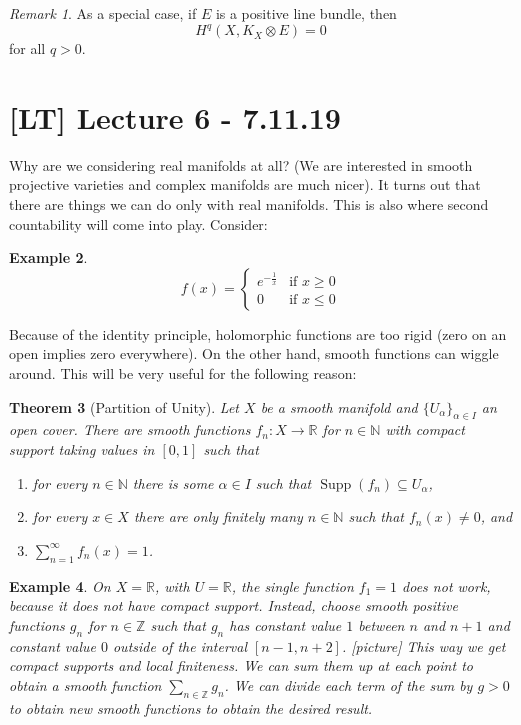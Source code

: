 \documentclass[12pt]{article}
\theoremstyle{darkgreentheorem}
\newtheorem{thm}{Theorem}[section]
\theoremstyle{darkbluedefinition}
\theoremstyle{darkredexample}
\newtheorem{exa}[thm]{Example}
\theoremstyle{remark}
\newtheorem{rem}[thm]{Remark}
\newcommand{\N}{\mathbb{N}}
\newcommand{\Z}{\mathbb{Z}}
\newcommand{\R}{\mathbb{R}}
\newcommand{\1}{\mathbbm{1}}
\DeclareMathOperator{\Supp}{Supp}
\newcommand{\ot}{\otimes}
\begin{document}
\begin{rem}
    As a special case, if $E$ is a positive line bundle, then
    \[H^{q}(X,K_{X}\ot E)=0\]
    for all $q>0$.
\end{rem}

\section{[LT] Lecture 6 - 7.11.19}

Why are we considering real manifolds at all?
(We are interested in smooth projective varieties and complex manifolds are much nicer).
It turns out that there are things we can do only with real manifolds.
This is also where second countability will come into play.
Consider:

\begin{exa}
    \[ f(x)=\begin{cases} e^{-\frac{1}{x}} &\text{if } x\geqslant 0 \\ 0 &\text{if } x\leqslant 0
    \end{cases} \]
\end{exa}
Because of the identity principle, holomorphic functions are too rigid (zero on an open implies zero everywhere).
On the other hand, smooth functions can wiggle around.
This will be very useful for the following reason:

\begin{thm}[Partition of Unity]
    Let $X$ be a smooth manifold and $\{ U_{\alpha}\}_{\alpha\in I}$ an open cover.
    There are smooth functions $f_{n}\colon X\to \R$ for $n\in \N$ with compact support taking values in $[0,1]$ such that
    \begin{enumerate}[label=\roman*)]
	\item for every $n\in \N$ there is some $\alpha\in I$ such that $\Supp(f_{n})\subseteq U_{\alpha}$,
	\item for every $x\in X$ there are only finitely many $n\in \N$ such that $f_{n}(x)\neq 0$, and
	\item $\sum_{n=1}^{\infty} f_{n}(x)=1$.
    \end{enumerate}
\end{thm}

\begin{exa}
    On $X=\R$, with $U=\R$, the single function $f_{1}=1$ does not work, because it does not have compact support.
    Instead, choose smooth positive functions $g_{n}$ for $n\in \Z$ such that $g_{n}$ has constant value $1$ between $n$ and $n+1$ and constant value $0$ outside of the interval $[n-1,n+2]$.
    [picture]
    This way we get compact supports and local finiteness.
    We can sum them up at each point to obtain a smooth function $\sum_{n\in \Z}g_{n}$.
    We can divide each term of the sum by $g>0$ to obtain new smooth functions to obtain the desired result.
\end{exa}
\end{document}
